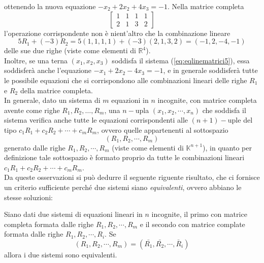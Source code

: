 ottenendo la nuova equazione $-x_2+2x_2+4x_3=-1$. Nella matrice completa
\begin{equation}
  \label{eq:determinante4}
  \begin{bmatrix}
    1 & 1 & 1 & 1\\
    2 & 1 & 3 & 2
  \end{bmatrix}
\end{equation}
l'operazione corrispondente non è nient'altro che la combinazione lineare
\begin{equation*}
  5R_1+(-3)R_2=5(1,1,1,1)+(-3)(2,1,3,2)=(-1,2,-4,-1)
\end{equation*}
delle sue due righe (viste come elementi di $\mathds{R}^4$).\\
Inoltre, se una terna $(x_1,x_2,x_3)$ soddisfa il sistema
(\ref{eq:eqlinematrici5}), essa soddisferà anche l'equazione
$-x_1+2x_2-4x_3=-1$, e in generale soddisferà tutte le possibile equazioni
che si corrispondono alle combinazioni lineari delle righe $R_1$ e $R_2$
della matrice completa.\\
In generale, dato un sistema di $m$ equazioni in $n$ incognite, con
matrice completa avente come righe $R_1,R_2,\dots,R_m$, una $n-$upla
$(x_1,x_2,\cdots,x_n)$ che soddisfa il sistema verifica anche tutte le
equazioni corrispondenti alle $(n+1)-$uple del tipo
$c_1R_1+c_2R_2+\cdots+c_mR_m$, ovvero quelle appartenenti al sottospazio
\begin{equation*}
  (R_1,R_2,\cdots,R_m)
\end{equation*}
generato dalle righe $R_1,R_2,\cdots,R_m$ (viste come elementi di
$\mathds{K}^{n+1}$), in quanto per definizione tale sottospazio è formato
proprio da tutte le combinazioni lineari $c_1R_1+c_2R_2+\cdots+c_mR_m$.\\
Da queste osservazioni si può dedurre il seguente riguente risultato, che
ci fornisce un criterio sufficiente perché due sistemi siano
\textit{equivalenti}, ovvero abbiano le stesse soluzioni:
\begin{prop}
  \label{prop:determinante1}
  Siano dati due sistemi di equazioni lineari in $n$ incognite, il
  primo con matrice completa formata dalle righe $R_1,R_2,\cdots,R_m$ e
  il secondo con matrice complate formata dalle righe
  $R_1,R_2,\cdots,R_i$. Se
  \begin{equation*}
    (R_1,R_2,\cdots,R_m)=(\bar{R_1},\bar{R_2},\cdots,\bar{R}_i)
  \end{equation*}
  allora i due sistemi sono equivalenti.
\end{prop}
